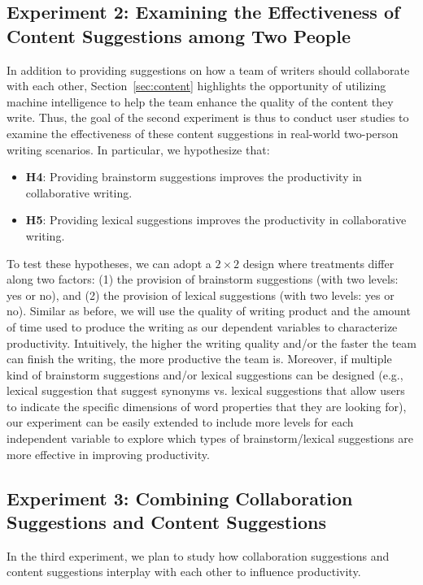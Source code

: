 \subsection{Experiment 2: Examining the Effectiveness of Content Suggestions among Two People}
\label{sec:exp2}
In addition to providing suggestions on how a team of writers should collaborate with each other, Section~\ref{sec:content} highlights the opportunity of utilizing machine intelligence to help the team enhance the quality of the content they write. Thus, the goal of the second experiment is thus to conduct user studies to examine the effectiveness of these content suggestions in real-world two-person writing scenarios. In particular, we hypothesize that:
\begin{itemize}
\item{\bf H4}: Providing brainstorm suggestions improves the productivity in collaborative writing.
\item{\bf H5}: Providing lexical suggestions improves the productivity in collaborative writing.
\end{itemize}

To test these hypotheses, we can adopt a $2\times 2$ design where treatments differ along two factors: (1) the provision of brainstorm suggestions (with two levels: yes or no), and (2) the provision of lexical suggestions (with two levels: yes or no). Similar as before, we will use the quality of writing product and the amount of time used to produce the writing as our dependent variables to characterize productivity. Intuitively, the higher the writing quality and/or the faster the team can finish the writing, the more productive the team is. Moreover, if multiple kind of brainstorm suggestions and/or lexical suggestions can be designed (e.g., lexical suggestion that suggest synonyms vs. lexical suggestions that allow users to indicate the specific dimensions of word properties that they are looking for), our experiment can be easily extended to include more levels for each independent variable to explore which types of brainstorm/lexical suggestions are more effective in improving productivity.

\subsection{Experiment 3: Combining Collaboration Suggestions and Content Suggestions}
\label{sec:exp3}

In the third experiment, we plan to study how collaboration suggestions and content suggestions interplay with each other to influence productivity.  


